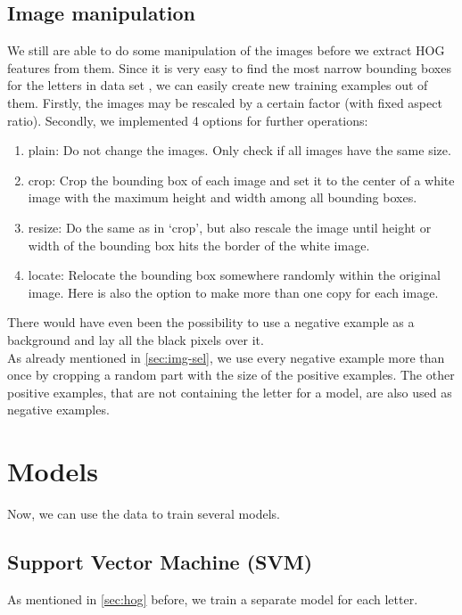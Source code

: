 \documentclass[conference]{IEEEtran}
\begin{document}
\subsection{Image manipulation}

We still are able to do some manipulation of the images before we extract HOG features from them. Since it is very easy to find the most narrow bounding boxes for the letters in data set \cite{bib:chars74k}, we can easily create new training examples out of them. Firstly, the images may be rescaled by a certain factor (with fixed aspect ratio). Secondly, we implemented 4 options for further operations:
\begin{enumerate}
\item plain: Do not change the images. Only check if all images have the same size.
\item crop: Crop the bounding box of each image and set it to the center of a white image with the maximum height and width among all bounding boxes.
\item resize: Do the same as in `crop', but also rescale the image until height or width of the bounding box hits the border of the white image.
\item locate: Relocate the bounding box somewhere randomly within the original image. Here is also the option to make more than one copy for each image.
\end{enumerate}
There would have even been the possibility to use a negative example as a background and lay all the black pixels over it. \\[-5pt]

As already mentioned in \ref{sec:img-sel}, we use every negative example more than once by cropping a random part with the size of the positive examples. The other positive examples, that are not containing the letter for a model, are also used as negative examples.

\section{Models}

\noindent
Now, we can use the data to train several models.

\subsection{Support Vector Machine (SVM)}


As mentioned in \ref{sec:hog} before, we train a separate model for each letter. 
\end{document}
